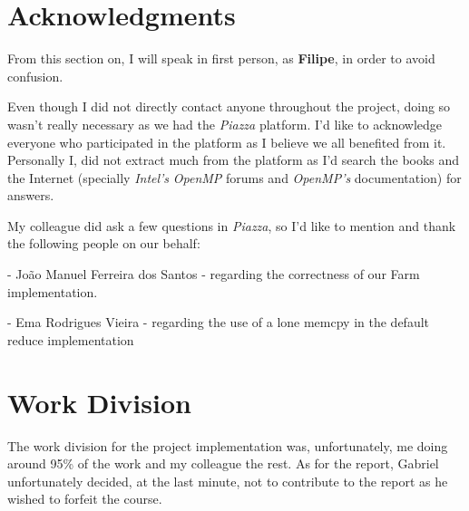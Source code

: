 \documentclass[10pt,journal]{IEEEtran}
\begin{document}
\section{Acknowledgments}

From this section on, I will speak in first person, as \textbf{Filipe}, in order to avoid confusion.

Even though I did not directly contact anyone throughout the project, doing so wasn't really necessary as we had the \textit{Piazza} platform. I'd like to acknowledge everyone who participated in the platform as I believe we all benefited from it. Personally I, did not extract much from the platform as I'd search the books and the Internet (specially \textit{Intel's} \textit{OpenMP} forums and \textit{OpenMP's} documentation) for answers.

My colleague did ask a few questions in \textit{Piazza}, so I'd like to mention and thank the following people on our behalf:

- João Manuel Ferreira dos Santos - regarding the correctness of our Farm implementation.

- Ema Rodrigues Vieira - regarding the use of a lone memcpy in the default reduce implementation


{}

\section{Work Division}

The work division for the project implementation was, unfortunately, me doing around 95\% of the work and my colleague the rest. As for the report, Gabriel unfortunately decided, at the last minute, not to contribute to the report as he wished to forfeit the course.
\end{document}
